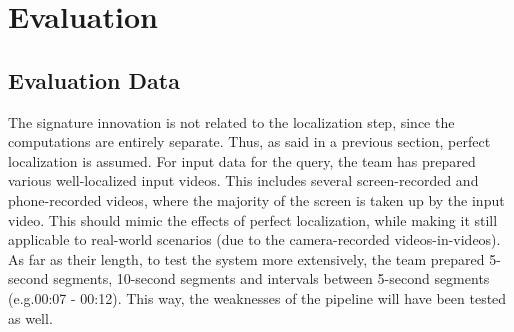 \documentclass{article}
\newcommand\tab[1][1cm]{\hspace*{#1}}
\begin{document}
\section*{Evaluation}
\subsection*{Evaluation Data}
\tab The signature innovation is not related to the localization step, since the computations are entirely separate. Thus, as said in a previous section, perfect localization is assumed. For input data for the query, the team has prepared various well-localized input videos. This includes several screen-recorded and phone-recorded videos, where the majority of the screen is taken up by the input video. This should mimic the effects of perfect localization, while making it still applicable to real-world scenarios (due to the camera-recorded videos-in-videos). As far as their length, to test the system more extensively, the team prepared 5-second segments, 10-second segments and intervals between 5-second segments (e.g.00:07 - 00:12). This way, the weaknesses of the pipeline will have been tested as well. 
\end{document}
